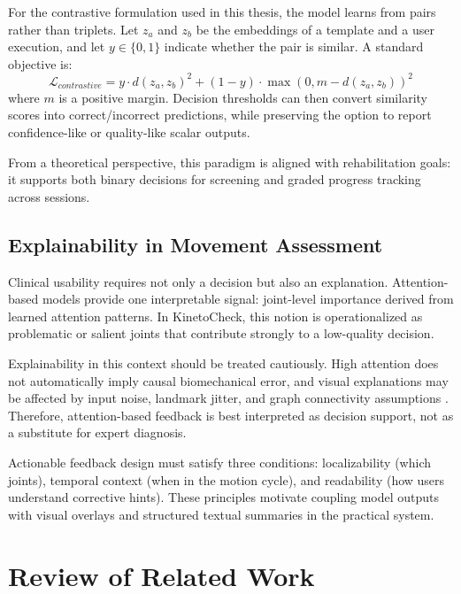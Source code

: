 For the contrastive formulation used in this thesis, the model learns from pairs rather than triplets. Let $z_a$ and $z_b$ be the embeddings of a template and a user execution, and let $y \in \{0, 1\}$ indicate whether the pair is similar. A standard objective is:
\begin{equation}
\mathcal{L}_{contrastive} = y \cdot d(z_a, z_b)^2 + (1 - y) \cdot \max(0, m - d(z_a, z_b))^2
\end{equation}
where $m$ is a positive margin. Decision thresholds can then convert similarity scores into correct/incorrect predictions, while preserving the option to report confidence-like or quality-like scalar outputs.

From a theoretical perspective, this paradigm is aligned with rehabilitation goals: it supports both binary decisions for screening and graded progress tracking across sessions.

\subsection{Explainability in Movement Assessment}
\label{subsec:explainability}

Clinical usability requires not only a decision but also an explanation. Attention-based models provide one interpretable signal: joint-level importance derived from learned attention patterns. In KinetoCheck, this notion is operationalized as problematic or salient joints that contribute strongly to a low-quality decision.

Explainability in this context should be treated cautiously. High attention does not automatically imply causal biomechanical error, and visual explanations may be affected by input noise, landmark jitter, and graph connectivity assumptions \cite{JW19,AGM+18,Rud19}. Therefore, attention-based feedback is best interpreted as decision support, not as a substitute for expert diagnosis.

Actionable feedback design must satisfy three conditions: localizability (which joints), temporal context (when in the motion cycle), and readability (how users understand corrective hints). These principles motivate coupling model outputs with visual overlays and structured textual summaries in the practical system.



\section{Review of Related Work}
\label{sec:related-work}

